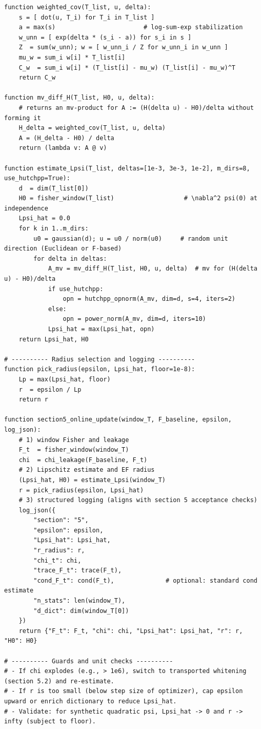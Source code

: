 \documentclass[10pt]{article}
\begin{document}
\begin{lstlisting}
function weighted_cov(T_list, u, delta):
    s = [ dot(u, T_i) for T_i in T_list ]
    a = max(s)                        # log-sum-exp stabilization
    w_unn = [ exp(delta * (s_i - a)) for s_i in s ]
    Z  = sum(w_unn); w = [ w_unn_i / Z for w_unn_i in w_unn ]
    mu_w = sum_i w[i] * T_list[i]
    C_w  = sum_i w[i] * (T_list[i] - mu_w) (T_list[i] - mu_w)^T
    return C_w

function mv_diff_H(T_list, H0, u, delta):
    # returns an mv-product for A := (H(delta u) - H0)/delta without forming it
    H_delta = weighted_cov(T_list, u, delta)
    A = (H_delta - H0) / delta
    return (lambda v: A @ v)

function estimate_Lpsi(T_list, deltas=[1e-3, 3e-3, 1e-2], m_dirs=8, use_hutchpp=True):
    d  = dim(T_list[0])
    H0 = fisher_window(T_list)                   # \nabla^2 psi(0) at independence
    Lpsi_hat = 0.0
    for k in 1..m_dirs:
        u0 = gaussian(d); u = u0 / norm(u0)     # random unit direction (Euclidean or F-based)
        for delta in deltas:
            A_mv = mv_diff_H(T_list, H0, u, delta)  # mv for (H(delta u) - H0)/delta
            if use_hutchpp:
                opn = hutchpp_opnorm(A_mv, dim=d, s=4, iters=2)
            else:
                opn = power_norm(A_mv, dim=d, iters=10)
            Lpsi_hat = max(Lpsi_hat, opn)
    return Lpsi_hat, H0

# ---------- Radius selection and logging ----------
function pick_radius(epsilon, Lpsi_hat, floor=1e-8):
    Lp = max(Lpsi_hat, floor)
    r  = epsilon / Lp
    return r

function section5_online_update(window_T, F_baseline, epsilon, log_json):
    # 1) window Fisher and leakage
    F_t  = fisher_window(window_T)
    chi  = chi_leakage(F_baseline, F_t)
    # 2) Lipschitz estimate and EF radius
    (Lpsi_hat, H0) = estimate_Lpsi(window_T)
    r = pick_radius(epsilon, Lpsi_hat)
    # 3) structured logging (aligns with section 5 acceptance checks)
    log_json({
        "section": "5",
        "epsilon": epsilon,
        "Lpsi_hat": Lpsi_hat,
        "r_radius": r,
        "chi_t": chi,
        "trace_F_t": trace(F_t),
        "cond_F_t": cond(F_t),              # optional: standard cond estimate
        "n_stats": len(window_T),
        "d_dict": dim(window_T[0])
    })
    return {"F_t": F_t, "chi": chi, "Lpsi_hat": Lpsi_hat, "r": r, "H0": H0}

# ---------- Guards and unit checks ----------
# - If chi explodes (e.g., > 1e6), switch to transported whitening (section 5.2) and re-estimate.
# - If r is too small (below step size of optimizer), cap epsilon upward or enrich dictionary to reduce Lpsi_hat.
# - Validate: for synthetic quadratic psi, Lpsi_hat -> 0 and r -> infty (subject to floor).
\end{lstlisting}
\end{document}
